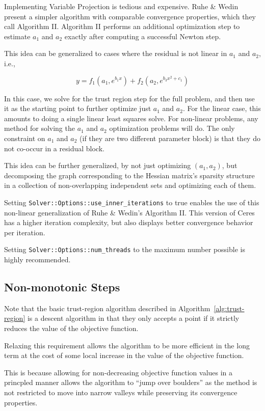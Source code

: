 Implementing Variable Projection is tedious and expensive. Ruhe \&
Wedin present a simpler algorithm with comparable convergence
properties, which they call Algorithm II.  Algorithm II performs an
additional optimization step to estimate $a_1$ and $a_2$ exactly after
computing a successful Newton step.


This idea can be generalized to cases where the residual is not
linear in $a_1$ and $a_2$, i.e.,

\begin{equation}
  y = f_1(a_1, e^{b_1 x}) + f_2(a_2, e^{b_3 x^2 + c_1})
\end{equation}

In this case, we solve for the trust region step for the full problem,
and then use it as the starting point to further optimize just $a_1$
and $a_2$. For the linear case, this amounts to doing a single linear
least squares solve. For non-linear problems, any method for solving
the $a_1$ and $a_2$ optimization problems will do. The only constraint
on $a_1$ and $a_2$ (if they are two different parameter block) is that
they do not co-occur in a residual block.

This idea can be further generalized, by not just optimizing $(a_1,
a_2)$, but decomposing the graph corresponding to the Hessian matrix's
sparsity structure in a collection of non-overlapping independent sets
and optimizing each of them.

Setting \texttt{Solver::Options::use\_inner\_iterations} to true
enables
the use of this non-linear generalization of Ruhe \& Wedin's Algorithm
II.  This version of Ceres has a higher iteration complexity, but also
displays better convergence behavior per iteration.

Setting \texttt{Solver::Options::num\_threads} to the maximum number
possible is highly recommended.

\subsection{Non-monotonic Steps}
\label{sec:non-monotonic}
Note that the basic trust-region algorithm described in
Algorithm~\ref{alg:trust-region} is a descent algorithm  in that they
only accepts a point if it strictly reduces the value of the objective
function.

Relaxing this requirement allows the algorithm to be more
efficient in the long term at the cost of some local increase
in the value of the objective function.

This is because allowing for non-decreasing objective function
values in a princpled manner allows the algorithm to ``jump over
boulders'' as the method is not restricted to move into narrow
valleys while preserving its convergence properties.

